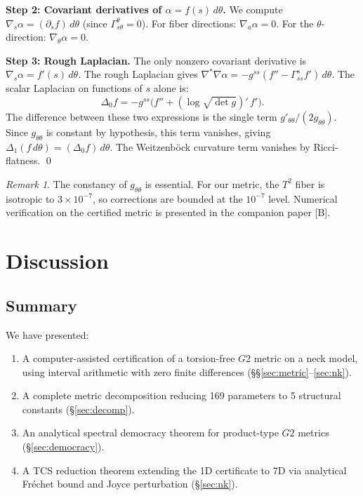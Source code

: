 \documentclass[11pt,a4paper]{article}
\theoremstyle{definition}
\theoremstyle{remark}
\newtheorem{remark}[theorem]{Remark}
\newcommand{\Gtwo}{\mathrm{G}_2}
\def\Gtwo{G2}%
\begin{document}
\textbf{Step 2: Covariant derivatives of $\alpha = f(s)\,d\theta$.} We compute $\nabla_s \alpha = (\partial_s f)\,d\theta$ (since $\Gamma^\theta_{s\theta} = 0$). For fiber directions: $\nabla_a \alpha = 0$. For the $\theta$-direction: $\nabla_\theta \alpha = 0$.

\textbf{Step 3: Rough Laplacian.} The only nonzero covariant derivative is $\nabla_s \alpha = f'(s)\,d\theta$. The rough Laplacian gives $\nabla^*\nabla \alpha = -g^{ss}(f'' - \Gamma^s_{ss} f')\,d\theta$. The scalar Laplacian on functions of $s$ alone is:
\[
\Delta_0 f = -g^{ss}\bigl(f'' + (\log\sqrt{\det g})'\, f'\bigr).
\]
The difference between these two expressions is the single term $g'_{\theta\theta}/(2g_{\theta\theta})$. Since $g_{\theta\theta}$ is constant by hypothesis, this term vanishes, giving $\Delta_1(f\,d\theta) = (\Delta_0 f)\,d\theta$. The Weitzenb\"ock curvature term vanishes by Ricci-flatness. \qed

\begin{remark}
The constancy of $g_{\theta\theta}$ is essential. For our metric, the $T^2$ fiber is isotropic to $3 \times 10^{-7}$, so corrections are bounded at the $10^{-7}$ level. Numerical verification on the certified metric is presented in the companion paper [B].
\end{remark}

\section{Discussion}\label{sec:discussion}

\subsection{Summary}

We have presented:
\begin{enumerate}
\item A computer-assisted certification of a torsion-free $\Gtwo$ metric on a neck model, using interval arithmetic with zero finite differences (§§\ref{sec:metric}--\ref{sec:nk}).
\item A complete metric decomposition reducing 169 parameters to 5 structural constants (§\ref{sec:decomp}).
\item An analytical spectral democracy theorem for product-type $\Gtwo$ metrics (§\ref{sec:democracy}).
\item A TCS reduction theorem extending the 1D certificate to 7D via analytical Fr\'echet bound and Joyce perturbation (§\ref{sec:nk}).
\end{enumerate}
\end{document}
